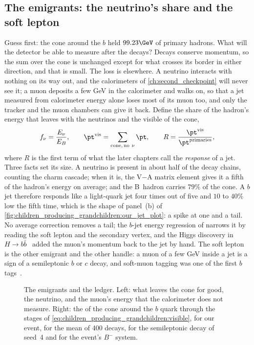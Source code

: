 \subsection{The emigrants: the neutrino's share and the soft lepton}
\label{sec:children_producing_grandchildren:emigrant}

Guess first: the cone around the $b$ held $99.23\GeV$ of primary hadrons.
What will the detector be able to measure after the decays? Decays
conserve momentum, so the sum over the cone is unchanged except for what
crosses its border in either direction, and that is small. The loss is
elsewhere. A neutrino interacts with nothing on its way out, and the
calorimeters of \cref{ch:second_checkpoint} will never see it; a muon
deposits a few GeV in the calorimeter and walks on, so that a jet measured
from calorimeter energy alone loses most of its muon too, and only the
tracker and the muon chambers can give it back. Define the share of the
hadron's energy that leaves with the neutrinos and the visible \pt of the
cone,
\begin{equation}
  f_\nu=\frac{E_\nu}{E_B},\qquad
  \pt^{\mathrm{vis}}=\sum_{\mathrm{cone},\,\mathrm{no}\ \nu}\pt,\qquad
  R=\frac{\pt^{\mathrm{vis}}}{\pt^{\mathrm{primaries}}},
  \label{eq:children_producing_grandchildren:visible}
\end{equation}
where $R$ is the first term of what the later chapters call the
\emph{response} of a jet. Three facts set its size. A neutrino is present
in about half of the decay chains, counting the charm cascade; when it
is, the V$-$A matrix element gives it a fifth of the hadron's energy on
average; and the B~hadron carries $79\%$ of the cone. A $b$ jet therefore
responds like a light-quark jet four times out of five and $10$ to $40\%$
low the fifth time, which is the shape of panel~(b) of
\cref{fig:children_producing_grandchildren:our_jet_plot}: a spike at one
and a tail. No average correction removes a tail; the $b$-jet energy
regression of \cite{CMS:2019uxx} narrows it by reading the soft lepton
and the secondary vertex, and the Higgs discovery in
$H\to b\bar b$~\cite{CMS:2018nsn} added the muon's momentum back to the
jet by hand. The soft lepton is the other emigrant and the other handle:
a muon of a few GeV inside a jet is a sign of a semileptonic $b$ or $c$
decay, and soft-muon tagging was one of the first $b$ tags~\cite{CMS:2012feb}.

\begin{figure}[htbp]\centering
\resizebox{\textwidth}{!}{}
\caption[What leaves the cone for good, and the cone through the stages]{The
emigrants and the ledger. Left: what leaves the cone for good, the
neutrino, and the muon's energy that the calorimeter does not measure.
Right: the \pt of the cone around the $b$ quark through the stages of
\cref{eq:children_producing_grandchildren:visible}, for our event, for the
mean of 400 decays, for the semileptonic decay of seed~4 and for the
\CMSSW event's $B^-$ system.}
\label{fig:children_producing_grandchildren:emigrant_sketch}
\end{figure}

